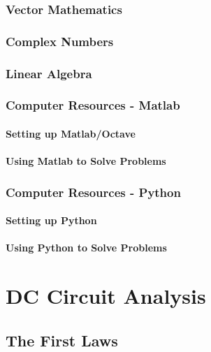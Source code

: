 \documentclass[a4paper,11pt]{book}
\begin{document}
\section{Vector Mathematics}


\section{Complex Numbers}


\section{Linear Algebra}


\section{Computer Resources - Matlab}
\subsection*{Setting up Matlab/Octave}
\subsection*{Using Matlab to Solve Problems}
\section{Computer Resources - Python}
\subsection*{Setting up Python}
\subsection*{Using Python to Solve Problems}

\part{DC Circuit Analysis}

\chapter{The First Laws}
\end{document}
